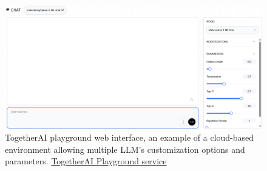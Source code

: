 \begin{figure}[htbp]
    \centering
    \includegraphics[width=\linewidth]{./figures/togetherai-playground.png}
    \caption{TogetherAI playground web interface, an example of a cloud-based environment allowing multiple LLM's customization options and parameters. \href{https://api.together.ai/playground}{TogetherAI Playground service}}
\end{figure}
\newpage

